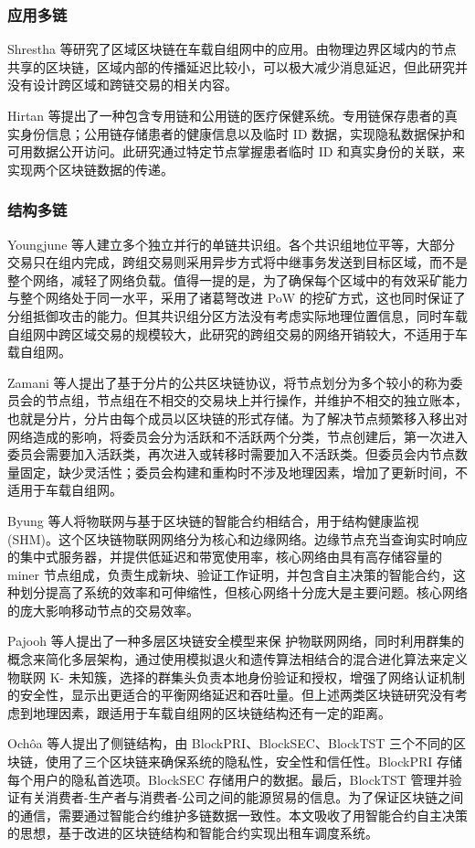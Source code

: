 \subsubsection{应用多链}
Shrestha 等研究了区域区块链在车载自组网中的应用。由物理边界区域内的节点共享的区块链，区域内部的传播延迟比较小，可以极大减少消息延迟，但此研究并没有设计跨区域和跨链交易的相关内容。\par
Hirtan 等提出了一种包含专用链和公用链的医疗保健系统。专用链保存患者的真实身份信息；公用链存储患者的健康信息以及临时 ID 数据，实现隐私数据保护和可用数据公开访问。此研究通过特定节点掌握患者临时 ID 和真实身份的关联，来实现两个区块链数据的传递。

\subsubsection{结构多链}
Youngjune 等人建立多个独立并行的单链共识组。各个共识组地位平等，大部分交易只在组内完成，跨组交易则采用异步方式将中继事务发送到目标区域，而不是整个网络，减轻了网络负载。值得一提的是，为了确保每个区域中的有效采矿能力与整个网络处于同一水平，采用了诸葛弩改进 PoW 的挖矿方式，这也同时保证了分组抵御攻击的能力。但其共识组分区方法没有考虑实际地理位置信息，同时车载自组网中跨区域交易的规模较大，此研究的跨组交易的网络开销较大，不适用于车载自组网。\par
Zamani 等人提出了基于分片的公共区块链协议，将节点划分为多个较小的称为委员会的节点组，节点组在不相交的交易块上并行操作，并维护不相交的独立账本，也就是分片，分片由每个成员以区块链的形式存储。为了解决节点频繁移入移出对网络造成的影响，将委员会分为活跃和不活跃两个分类，节点创建后，第一次进入委员会需要加入活跃类，再次进入或转移时需要加入不活跃类。但委员会内节点数量固定，缺少灵活性；委员会构建和重构时不涉及地理因素，增加了更新时间，不适用于车载自组网。\par
Byung 等人将物联网与基于区块链的智能合约相结合，用于结构健康监视 (SHM)。这个区块链物联网网络分为核心和边缘网络。边缘节点充当查询实时响应的集中式服务器，并提供低延迟和带宽使用率，核心网络由具有高存储容量的miner 节点组成，负责生成新块、验证工作证明，并包含自主决策的智能合约，这种划分提高了系统的效率和可伸缩性，但核心网络十分庞大是主要问题。核心网络的庞大影响移动节点的交易效率。\par
Pajooh 等人提出了一种多层区块链安全模型来保
护物联网网络，同时利用群集的概念来简化多层架构，通过使用模拟退火和遗传算法相结合的混合进化算法来定义物联网 K- 未知簇，选择的群集头负责本地身份验证和授权，增强了网络认证机制的安全性，显示出更适合的平衡网络延迟和吞吐量。但上述两类区块链研究没有考虑到地理因素，跟适用于车载自组网的区块链结构还有一定的距离。\par
Ochôa 等人提出了侧链结构，由 BlockPRI、BlockSEC、BlockTST 三个不同的区块链，使用了三个区块链来确保系统的隐私性，安全性和信任性。BlockPRI 存储每个用户的隐私首选项。BlockSEC 存储用户的数据。最后，BlockTST 管理并验证有关消费者-生产者与消费者-公司之间的能源贸易的信息。为了保证区块链之间的通信，需要通过智能合约维护多链数据一致性。本文吸收了用智能合约自主决策的思想，基于改进的区块链结构和智能合约实现出租车调度系统。
